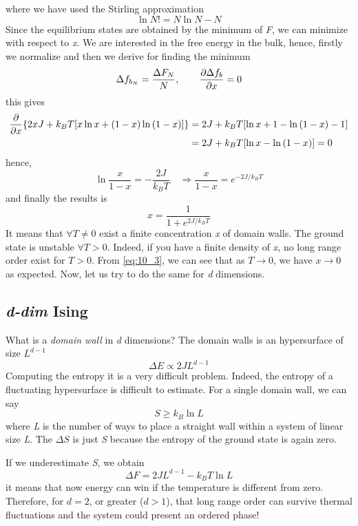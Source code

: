 \documentclass[../main/main.tex]{subfiles}
\begin{document}
where we have used the Stirling approximation
\begin{equation*}
 \ln{N!} = N \ln{N} - N   
\end{equation*}
Since the equilibrium states are obtained by the minimum of \emph{F}, we can minimize with respect to \emph{x}. We are interested in the free energy in the bulk, hence, firstly we normalize and then we derive for finding the minimum
\begin{equation}
  \Delta f_{b_N} = \frac{\Delta F_N}{N}, \qquad \pdv{\Delta f_b}{x} = 0
\end{equation}
this gives 
\begin{equation*}
\begin{split}
  \pdv{}{x} \qty{ 2xJ +k_B T \qty[x \ln{x} + (1-x)\ln{(1-x)}  ] } &=  2J + k_B T \qty[\ln{x} +1 -\ln{(1-x)} -1 ]\\
  & = 2J + k_B T \qty[\ln{x}- \ln{(1-x)}  ] = 0
\end{split}
\end{equation*}
hence,
\begin{equation*}
  \ln{\frac{x}{1-x}} = -\frac{2J}{k_B T} \quad \Rightarrow \frac{x}{1-x} = e^{-2J/k_BT}
\end{equation*}
and finally the results is
\begin{equation}
 x = \frac{1}{1+e^{2J/k_BT} }
 \label{eq:10_3}
\end{equation}
It means that  \( \forall T \neq 0 \) exist a finite concentration \emph{x} of domain walls. The ground state is unstable \( \forall T>0 \). Indeed, if you have a finite density of \emph{x}, no long range order exist for \( T>0 \).  From \eqref{eq:10_3}, we can see that as \( T \rightarrow 0 \),  we have \( x \rightarrow 0\) as expected.
Now, let us try to do the same for \emph{d} dimensions.

\subsection{\emph{d-dim} Ising}
What is a \emph{domain wall} in \emph{d} dimensions? The domain walls is an hypersurface of size \( L^{d-1} \)
\begin{equation}
  \Delta E \propto 2JL^{d-1}
\end{equation}
Computing the entropy it is a very difficult problem. Indeed, the entropy of a fluctuating hypersurface is difficult to estimate. 
For a single domain wall, we can say
\begin{equation}
  S \ge k_B \ln{L}
\end{equation}
where  \emph{L} is the number of ways to place a straight wall within a system of linear size \emph{L}.
The \( \Delta S \)  is just \emph{S}  because the entropy of the ground state is again zero.
\begin{remark}
If we underestimate \emph{S}, we obtain
\begin{equation}
  \Delta F = 2JL^{d-1}-k_B T \ln{L}
\end{equation}
it means that now energy can win if the temperature is different from zero. Therefore, for \( d=2 \),  or greater (\( d>1 \)), that long range order can survive  thermal fluctuations and the system could present an ordered phase!
\end{remark}
\end{document}
